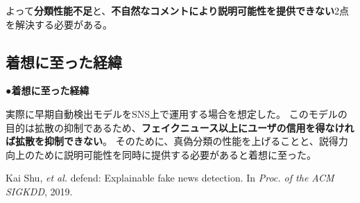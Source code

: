 {	よって\textbf{分類性能不足}と、\textbf{不自然なコメントにより説明可能性を提供できない}2点を解決する必要がある。

	\subsection{着想に至った経緯}
	\noindent
	●\textbf{着想に至った経緯}

	実際に早期自動検出モデルをSNS上で運用する場合を想定した。
	このモデルの目的は拡散の抑制であるため、\textbf{フェイクニュース以上にユーザの信用を得なければ拡散を抑制できない}。
	そのために、真偽分類の性能を上げることと、説得力向上のために説明可能性を同時に提供する必要があると着想に至った。

	{\footnotesize
		\begin{thebibliography}{99}
			\vspace*{-1mm}
			\setlength{\parskip}{0cm}
			\setlength{\itemsep}{0cm}
			\setcounter{enumiv}{7}
			\begin{spacing}{0.7}
				 Kai Shu, \textit{et al.} defend: Explainable fake news detection. In \textit{Proc. of the ACM SIGKDD}, 2019.
			\end{spacing}
			\end{thebibliography}
			
	}
}

